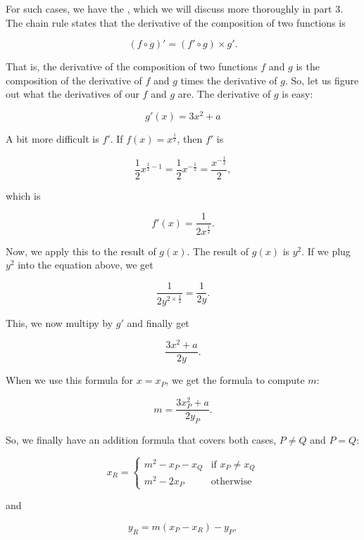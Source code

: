 \documentclass[tikz]{scrreprt}
\begin{document}
For such cases, we have the ,
which we will discuss more thoroughly in part 3.
The chain rule states that the derivative of
the composition of two functions is

\begin{equation}
(f \circ g)' = (f' \circ g) \times g'.
\end{equation}

That is, the derivative of the composition 
of two functions $f$ and $g$ is the composition
of the derivative of $f$ and $g$ times the
derivative of $g$. So, let us figure out 
what the derivatives of our $f$ and $g$ are. 
The derivative of $g$ is easy:

\[
g'(x) = 3x^2 + a
\]

A bit more difficult is $f'$. If $f(x) = x^\frac{1}{2}$,
then $f'$ is

\[
\frac{1}{2}x^{\frac{1}{2}-1} = 
\frac{1}{2}x^{-\frac{1}{2}}  =
\frac{x^{-\frac{1}{2}}}{2},
\]

which is 

\[
f'(x) = \frac{1}{2x^{\frac{1}{2}}}. 
\]

Now, we apply this to the result of $g(x)$.
The result of $g(x)$ is $y^2$. 
If we plug $y^2$ into the equation above,
we get 

\[
\frac{1}{2y^{2\times\frac{1}{2}}} = \frac{1}{2y}.
\]

This, we now multipy by $g'$ and finally get 

\[
\frac{3x^2 + a}{2y}.
\]

When we use this formula for $x=x_P$,
we get the formula to compute $m$:

\begin{equation}
m = \frac{3x_P^2 + a}{2y_P}.
\end{equation}

So, we finally have an addition formula
that covers both cases, $P \neq Q$ and $P = Q$:

\begin{equation}
x_R = \begin{cases}
        m^2 - x_P - x_Q & \textrm{if $x_P \neq x_Q$}\\
        m^2 - 2x_P      & \textrm{otherwise}
      \end{cases}
\end{equation}

and

\begin{equation}
y_R = m(x_P-x_R) - y_P,
\end{equation}
\end{document}
